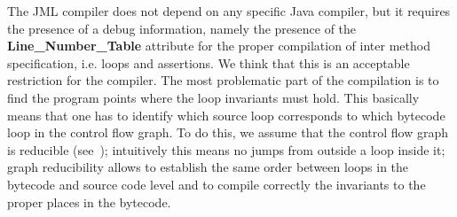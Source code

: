 The JML compiler does not depend on any specific Java compiler, but it requires the presence of a debug information, namely the presence of the \textbf{Line\_Number\_Table} attribute for the proper compilation of inter method specification, i.e. loops and assertions. We think that this is an acceptable restriction for the compiler. The most problematic part of the compilation is to find the program points where the loop invariants must hold. This basically means that one has to identify which source loop corresponds to which bytecode loop in the control flow graph. To do this, we assume that the control flow graph is reducible (see~\cite{ARUCom1986}); intuitively this means no jumps from outside a loop inside it; graph reducibility allows to establish the same order between loops in the bytecode and source code level and to compile correctly the invariants to the proper places in the bytecode.


